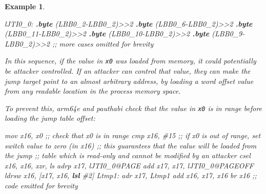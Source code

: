 \documentclass[
  a4paper,
]{report}
\newtheorem{example}{Example}
\newenvironment{Shaded}{}{}
\newcommand{\CommentTok}[1]{\textcolor[rgb]{0.38,0.63,0.69}{\textit{#1}}}
\newcommand{\DecValTok}[1]{\textcolor[rgb]{0.25,0.63,0.44}{#1}}
\newcommand{\FunctionTok}[1]{\textcolor[rgb]{0.02,0.16,0.49}{#1}}
\newcommand{\KeywordTok}[1]{\textcolor[rgb]{0.00,0.44,0.13}{\textbf{#1}}}
\newcommand{\NormalTok}[1]{#1}
\newcommand{\OperatorTok}[1]{\textcolor[rgb]{0.40,0.40,0.40}{#1}}
\begin{document}
\begin{example}
\begin{Shaded}
\begin{Highlighting}[]
\FunctionTok{lJTI0\_0:}
  \KeywordTok{.byte} \OperatorTok{(}\NormalTok{LBB0\_2}\OperatorTok{{-}}\NormalTok{LBB0\_2}\OperatorTok{)\textgreater{}\textgreater{}}\DecValTok{2}
  \KeywordTok{.byte} \OperatorTok{(}\NormalTok{LBB0\_6}\OperatorTok{{-}}\NormalTok{LBB0\_2}\OperatorTok{)\textgreater{}\textgreater{}}\DecValTok{2}
  \KeywordTok{.byte} \OperatorTok{(}\NormalTok{LBB0\_11}\OperatorTok{{-}}\NormalTok{LBB0\_2}\OperatorTok{)\textgreater{}\textgreater{}}\DecValTok{2}
  \KeywordTok{.byte} \OperatorTok{(}\NormalTok{LBB0\_10}\OperatorTok{{-}}\NormalTok{LBB0\_2}\OperatorTok{)\textgreater{}\textgreater{}}\DecValTok{2}
  \KeywordTok{.byte} \OperatorTok{(}\NormalTok{LBB0\_9}\OperatorTok{{-}}\NormalTok{LBB0\_2}\OperatorTok{)\textgreater{}\textgreater{}}\DecValTok{2}
  \CommentTok{;; more cases omitted for brevity}
\end{Highlighting}
\end{Shaded}

In this sequence, if the value in \texttt{x0} was loaded from memory, it
could potentially be attacker controlled. If an attacker can control
that value, they can make the jump target point to an almost arbitrary
address, by loading a word offset value from any readable location in
the process memory space.

To prevent this, arm64e and pauthabi check that the value in \texttt{x0}
is in range before loading the jump table offset:

\begin{Shaded}
\begin{Highlighting}[]
\NormalTok{  mov   x16}\OperatorTok{,}\NormalTok{ x0}
  \CommentTok{;; check that x0 is in range}
\NormalTok{  cmp   x16}\OperatorTok{,} \CommentTok{\#15}
  \CommentTok{;; if x0 is out of range, set switch value to zero (in x16)}
  \CommentTok{;; this guarantees that the value will be loaded from the jump}
  \CommentTok{;; table which is read{-}only and cannot be modified by an attacker}
\NormalTok{  csel  x16}\OperatorTok{,}\NormalTok{ x16}\OperatorTok{,}\NormalTok{ xzr}\OperatorTok{,}\NormalTok{ ls}
\NormalTok{  adrp  x17}\OperatorTok{,}\NormalTok{ lJTI0\_0}\CommentTok{@PAGE}
\NormalTok{  add   x17}\OperatorTok{,}\NormalTok{ x17}\OperatorTok{,}\NormalTok{ lJTI0\_0}\CommentTok{@PAGEOFF}
\NormalTok{  ldrsw x16}\OperatorTok{,} \OperatorTok{[}\NormalTok{x17}\OperatorTok{,}\NormalTok{ x16}\OperatorTok{,} \KeywordTok{lsl} \CommentTok{\#2]}
\FunctionTok{Ltmp1:}
\NormalTok{  adr   x17}\OperatorTok{,}\NormalTok{ Ltmp1}
\NormalTok{  add    x16}\OperatorTok{,}\NormalTok{ x17}\OperatorTok{,}\NormalTok{ x16}
\NormalTok{  br     x16}
  \CommentTok{;; code emitted for brevity}


\end{Highlighting}
\end{Shaded}
\end{example}
\end{document}
